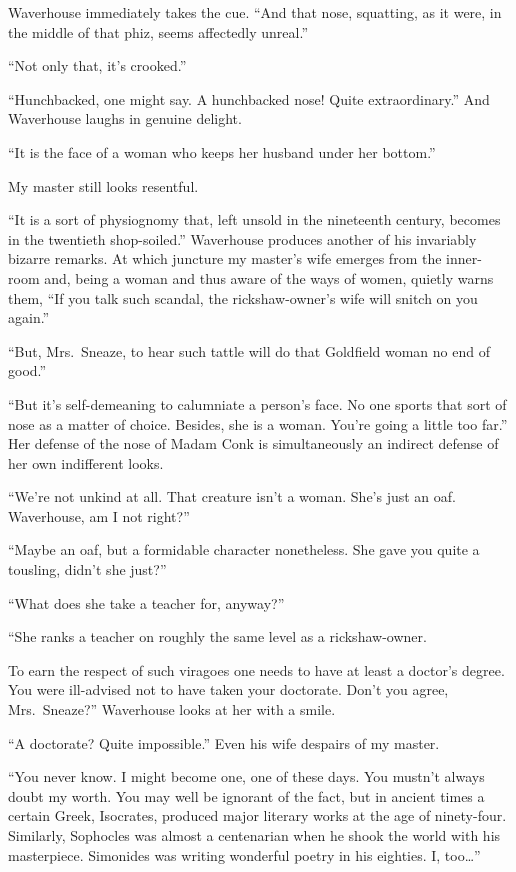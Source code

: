 \documentclass[12pt, openright]{book}
\begin{document}
Waverhouse immediately takes the cue. ``And that nose, squatting, as it
were, in the middle of that phiz, seems affectedly unreal.''

``Not only that, it's crooked.''

``Hunchbacked, one might say. A hunchbacked nose! Quite extraordinary.''
And Waverhouse laughs in genuine delight.

``It is the face of a woman who keeps her husband under her bottom.''

My master still looks resentful.

``It is a sort of physiognomy that, left unsold in the nineteenth
century, becomes in the twentieth shop-soiled.'' Waverhouse produces
another of his invariably bizarre remarks. At which juncture my master's
wife emerges from the inner-room and, being a woman and thus aware of
the ways of women, quietly warns them, ``If you talk such scandal, the
rickshaw-owner's wife will snitch on you again.''

``But, Mrs.~Sneaze, to hear such tattle will do that Goldfield woman no
end of good.''

``But it's self-demeaning to calumniate a person's face. No one sports
that sort of nose as a matter of choice. Besides, she is a woman. You're
going a little too far.'' Her defense of the nose of Madam Conk is
simultaneously an indirect defense of her own indifferent looks.

``We're not unkind at all. That creature isn't a woman. She's just an
oaf. Waverhouse, am I not right?''

``Maybe an oaf, but a formidable character nonetheless. She gave you
quite a tousling, didn't she just?''

``What does she take a teacher for, anyway?''

``She ranks a teacher on roughly the same level as a rickshaw-owner.

To earn the respect of such viragoes one needs to have at least a
doctor's degree. You were ill-advised not to have taken your doctorate.
Don't you agree, Mrs.~Sneaze?'' Waverhouse looks at her with a smile.

``A doctorate? Quite impossible.'' Even his wife despairs of my master.

``You never know. I might become one, one of these days. You mustn't
always doubt my worth. You may well be ignorant of the fact, but in
ancient times a certain Greek, Isocrates, produced major literary works
at the age of ninety-four. Similarly, Sophocles was almost a centenarian
when he shook the world with his masterpiece. Simonides was writing
wonderful poetry in his eighties. I, too\ldots{}''
\end{document}

